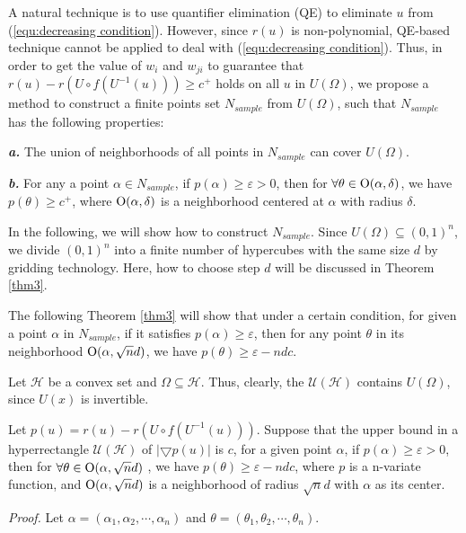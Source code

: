 A natural technique is to use quantifier elimination (QE) to eliminate $u$ from (\ref{equ:decreasing condition}). However, since $r(u)$ is non-polynomial, QE-based technique cannot be applied to deal with (\ref{equ:decreasing condition}). Thus, in order to get the value of $w_i$ and $w_{ji}$ to guarantee that  $r(u) - r(U \circ f({U^{ - 1}}(u))) \ge {c^ + }$ holds on all $u$ in $U(\Omega)$, we propose a method to construct a finite points set $N_{sample}$ from $U(\Omega)$, such that $N_{sample}$ has the following properties:

\textbf{\emph{a.}} The union of neighborhoods of all points in $N_{sample}$ can cover $U(\Omega)$.

\textbf{\emph{b.}} For any a point $\alpha \in N_{sample}$, if $p(\alpha) \ge \varepsilon  > 0$, then for $\forall \theta \in {\rm O}(\alpha ,\delta )$, we have $p(\theta) \ge {c^ + }$, where ${\rm O}(\alpha ,\delta )$ is a neighborhood centered at $\alpha$ with radius $\delta$.

In the following, we will show how to construct $N_{sample}$. Since $U(\Omega ) \subseteq (0,1)^n$, we divide $(0,1)^n$ into a finite number of hypercubes with the same size $d$ by gridding technology. Here, how to choose step $d$ will be discussed in Theorem \ref{thm3}.

The following Theorem \ref{thm3} will show that under a certain condition, for given a point $\alpha $ in $N_{sample}$, if it satisfies $p(\alpha) \ge \varepsilon$, then for any point $\theta $ in its neighborhood ${\rm O}(\alpha ,\sqrt n d )$, we have $p(\theta) \ge \varepsilon-ndc$.

Let $\mathcal{H}$ be a convex set and $\Omega \subseteq \mathcal{H}$. Thus, clearly, the $\mathcal{U(H)}$ contains $U(\Omega)$, since $U(x)$ is invertible.
\begin{mythm}\label{thm3}
	Let $p(u) = r(u) - r(U \circ f({U^{ - 1}}(u)))$. Suppose that the upper bound in a hyperrectangle $\mathcal{U(H)}$ of $\left| \bigtriangledown p(u) \right|$ is $c$, for a given point $\alpha$, if $p(\alpha ) \ge \varepsilon  > 0$, then for $\forall \theta  \in {\rm O}(\alpha ,\sqrt n d )$ , we have $p(\theta ) \ge \varepsilon  - ndc$, where $p$ is a n-variate function, and ${\rm O}(\alpha ,\sqrt n d )$ is a neighborhood of radius $\sqrt n d$ with $\alpha $ as its center.
\end{mythm}
\emph{Proof.}
Let $\alpha  = ({\alpha _1},{\alpha _2}, \cdots ,{\alpha _n})$ and $\theta  = ({\theta _1},{\theta _2}, \cdots ,{\theta _n})$.

